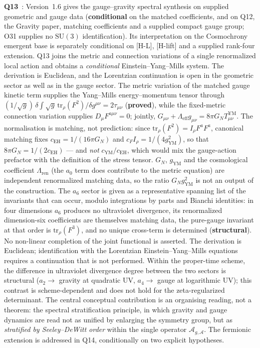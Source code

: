 \documentclass[11pt,a4paper]{article}
\newcommand{\SU}{\mathrm{SU}}
\newcommand{\sproved}{\textcolor{cproved}{\textbf{proved}}}
\newcommand{\sstruct}{\textcolor{cstruct}{\textbf{structural}}}
\newcommand{\scond}{\textcolor{ccond}{\textbf{conditional}}}
\begin{document}
    \textbf{Q13}~\cite{Beau2026q13}: Version~1.6 gives the gauge--gravity spectral synthesis
    on supplied geometric and gauge data (\scond{} on the matched coefficients, and on Q12, the Gravity paper,
    matching coefficients and a supplied compact gauge group; O31 supplies no
    $\SU(3)$ identification). Its interpretation on the Cosmochrony emergent base is separately
    conditional on [H-L], [H-lift] and a supplied rank-four extension. Q13 joins the metric and connection variations
    of a single renormalized
    local action and obtains a \emph{conditional} Einstein--Yang--Mills system.
    The derivation is Euclidean, and the Lorentzian continuation is open in the geometric sector as well as in
    the gauge sector.
    The metric variation of the matched gauge kinetic term supplies the Yang--Mills
    energy--momentum tensor through
    $(1/\sqrt{g})\,\delta\!\int\!\sqrt{g}\,\mathrm{tr}_\rho(F^2)/\delta g^{\mu\nu}
    = 2\tau_{\mu\nu}$ (\sproved), while the fixed-metric connection variation supplies
    $D_\mu F^{a\mu\nu} = 0$; jointly,
    $G_{\mu\nu} + \Lambda_{\mathrm{eff}} g_{\mu\nu} = 8\pi G_N T^{\mathrm{YM}}_{\mu\nu}$.
    The normalisation is matching, not prediction: since
    $\mathrm{tr}_\rho(F^2) = I_\rho F^a F^a$, canonical matching fixes
    $c_{\mathrm{EH}} = 1/(16\pi G_N)$ and $c_F I_\rho = 1/(4g_{\mathrm{YM}}^2)$, so that
    $8\pi G_N = 1/(2c_{\mathrm{EH}})$ --- and \emph{not} $c_{\mathrm{YM}}/c_{\mathrm{EH}}$,
    which would mix the gauge-action prefactor with the definition of the stress tensor.
    $G_N$, $g_{\mathrm{YM}}$ and the cosmological coefficient $\Lambda_{\mathrm{ren}}$ (the $a_0$
    term does contribute to the metric equation) are independent renormalized matching data, so
    the ratio $G_N g_{\mathrm{YM}}^2$ is not an output of the construction.
    The $a_6$ sector is given as a representative spanning list of the invariants that can occur,
    modulo integrations by parts and Bianchi identities: in four dimensions $a_6$ produces no
    ultraviolet divergence, its renormalized dimension-six coefficients are themselves matching
    data, the pure-gauge invariant at that order is $\mathrm{tr}_\rho(F^3)$, and no unique
    cross-term is determined (\sstruct).
    No non-linear completion of the joint functional is asserted.
    The derivation is Euclidean; identification with the Lorentzian Einstein--Yang--Mills
    equations requires a continuation that is not performed.
    Within the proper-time scheme, the difference in ultraviolet divergence degree between the two
    sectors is structural ($a_2 \to$ gravity at quadratic UV, $a_4 \to$ gauge at logarithmic UV);
    this contrast is scheme-dependent and does not hold for the zeta-regularized determinant.
    The central conceptual contribution is an organising reading, not a theorem: the spectral
    stratification principle, in which gravity and gauge dynamics are read not as unified by enlarging the
    symmetry group, but as \emph{stratified by Seeley--DeWitt order} within the single operator
    $\mathcal{A}_{g,\mathcal{A}}$.
    The fermionic extension is addressed in Q14, conditionally on two explicit hypotheses.
\end{document}
